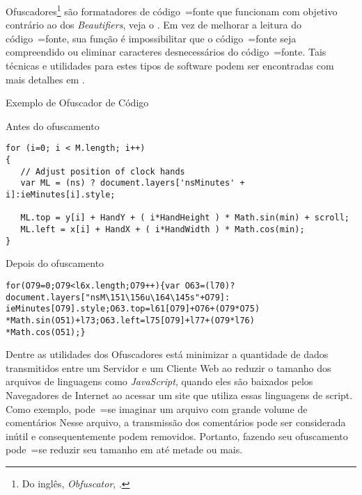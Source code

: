 Ofuscadores\footnote{Do inglês,
\textit{Obfuscator},
.
}
são formatadores de código~=fonte que funcionam com objetivo contrário ao dos \textit{Beautifiers},
veja o .
Em vez de melhorar a leitura do código~=fonte,
sua função é impossibilitar que o código~=fonte seja compreendido ou
eliminar caracteres desnecessários do código~=fonte.
Tais técnicas e
utilidades para estes tipos de software podem ser encontradas com mais detalhes em .
\begin{quadro}[!htb]
\caption[Exemplo de Ofuscador de Código]{Exemplo de Ofuscador de Código \cite{familyOfSourceCodeObfuscators}}
\label{frame:exemploDeOfuscador}
\begin{bluebox}
\begin{code}
\caption{Antes do ofuscamento}
\begin{verbatim}
for (i=0; i < M.length; i++)
{
   // Adjust position of clock hands
   var ML = (ns) ? document.layers['nsMinutes' + i]:ieMinutes[i].style;

   ML.top = y[i] + HandY + ( i*HandHeight ) * Math.sin(min) + scroll;
   ML.left = x[i] + HandX + ( i*HandWidth ) * Math.cos(min);
}
\end{verbatim}
\end{code}

\begin{code}
\caption{Depois do ofuscamento}
\begin{verbatim}
for(O79=0;O79<l6x.length;O79++){var O63=(l70)?
document.layers["nsM\151\156u\164\145s"+O79]:
ieMinutes[O79].style;O63.top=l61[O79]+O76+(O79*O75)
*Math.sin(O51)+l73;O63.left=l75[O79]+l77+(O79*l76)
*Math.cos(O51);}
\end{verbatim}
\end{code}
\end{bluebox}
\end{quadro}

Dentre as utilidades dos Ofuscadores está minimizar a quantidade de dados transmitidos entre um Servidor e
um Cliente Web ao reduzir o tamanho dos arquivos de linguagens como \textit{JavaScript},
quando eles são baixados pelos Navegadores de Internet ao acessar um site que utiliza essas linguagens de script.
Como exemplo,
pode~=se imaginar um arquivo com grande volume de comentários Nesse arquivo,
a transmissão dos comentários pode ser considerada inútil e
consequentemente podem removidos.
Portanto,
fazendo seu ofuscamento pode~=se reduzir seu tamanho em até metade ou
mais.


